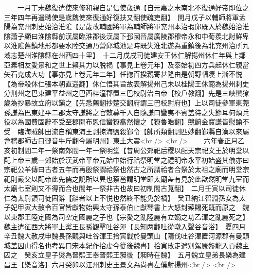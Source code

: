 　　一月丁未魏復遣使來修和親自是信使歲通【自元嘉之末南北不復通好帝即位之三年四年再遣聘使是歲魏使來復通好復扶又翻使疏吏翻】　閏月戊子以輔師將軍孟陽為兖州刺史始治淮隂【是歲改輔國將軍為輔師將軍兖州本治瑕邱既入於魏始治淮隂蕭子顯曰淮隂縣前漢屬臨淮郡後漢屬下邳國晉屬廣陵郡穆帝永和中荀羨北討鮮卑以淮隂舊鎮地形都要水陸交通乃營邱城池是時既失淮北遂為重鎮後為北兖州治所九域志楚州淮隂縣在州西四十里】　十二月戊戌司徒建安王休仁解揚州休仁年與上鄰亞素相友愛景和之世上賴其力以脱禍【事見上卷元年】及泰始初四方兵起休仁親當矢石克成大功【事亦見上卷元年二年】任揔百揆親寄甚隆由是朝野輻凑上漸不悦【為帝殺休仁張本朝直遥翻】休仁悟其旨故表解揚州己未以桂陽王休範為揚州刺史　分荆州之巴東建平益州之巴西梓潼郡置三巴校尉治白帝【校戶教翻】先是三峽蠻獠歲為抄暴故立府以鎭之【先悉薦翻抄楚交翻府謂三巴校尉府也】上以司徒參軍東莞孫謙為巴東建平二郡太守謙將之官敕募千人自隨謙曰蠻夷不賓盖待之失節耳何煩兵役以為國費固辭不受至郡開布恩信蠻獠翕然懷之【獠魯皓翻】競餉金寶謙皆慰諭不受　臨海賊帥田流自稱東海王剽掠海鹽殺鄞令【帥所類翻剽匹妙翻鄞縣自漢以來屬會稽郡師古曰鄞音牛斤翻今屬明州】東土大震<br />
<br />
　　六年春正月乙亥初制間二年一祭南郊間一年一祭明堂【昔周公郊祀后稷以配天宗祀文王於明堂以配上帝三歲一郊始於漢武帝平帝元始中始行祫祭明堂之禮明帝永平初始盛其儀亦曰宗祀公羊傳曰古者五年而再殷祭謂祫祭也然古之所謂祫者合祭於太祖之廟而明堂宗祀則嚴父以配帝此先儒之說所以異也蔡邕謂明堂即太廟盖有見於此歟然明堂九室而太廟七室則又不得而合也間年一祭非古也故曰初制間古莧翻】　二月壬寅以司徒休仁為太尉領司徒固辭【辭者以上不悦也然終不能免於禍】　癸丑納江智淵孫女為太子妃甲寅大赦令百官皆獻物始興太守孫泰伯止獻琴書上大怒封藥賜死既而原之　魏以東郡王陸定國為司空定國麗之子也【宗愛之亂陸麗有立嫡之功乙渾之亂麗死之】　魏主遣征西大將軍上黨王長孫觀擊吐谷渾【長知两翻吐從暾入聲谷音浴】　夏四月辛丑魏大赦戌申魏長孫觀與吐谷渾王拾寅戰於曼頭山【隋伐吐谷渾置河源郡有曼頭城盖因山得名也考異曰宋本紀作拾虔今從後魏書】拾寅敗走遣别駕康盤龍入貢魏主囚之　癸亥立皇子爕為晉熙王奉晉熙王昶後【昶時在魏】　五月魏立皇弟長樂為建昌王【樂音洛】六月癸卯以江州刺史王景文為尚書左僕射揚州<br />
<br />
